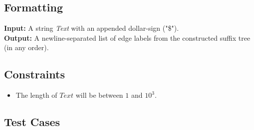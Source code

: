 \documentclass{article}
\begin{document}
\subsection*{Formatting}
\noindent\textbf{Input:} A string \emph{Text} with an appended dollar-sign ("\$").\\
\noindent\textbf{Output:} A newline-separated list of edge labels from the constructed suffix tree (in any order).

\subsection*{Constraints}
\begin{itemize}
    \item The length of $Text$ will be between $1$ and $10^3$.
\end{itemize}
\pagebreak

\subsection*{Test Cases}
\end{document}
